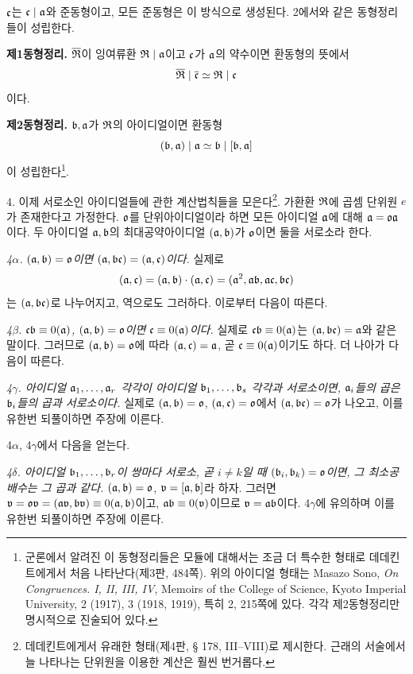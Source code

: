 \(\mc\)는 \(\mc\mid\ma\)와 준동형이고, 모든 준동형은 이 방식으로 생성된다. 2에서와 같은 동형정리들이 성립한다.

\textbf{제1동형정리.} \(\overline{\mR}\)이 잉여류환 \(\mR\mid\ma\)이고 \(\mc\)가 \(\ma\)의 약수이면 환동형의 뜻에서
\[
        \overline{\mR}\mid\overline{\mc}\simeq\mR\mid\mc
\]
이다.

\textbf{제2동형정리.} \(\mb,\ma\)가 \(\mR\)의 아이디얼이면 환동형
\[
        (\mb,\ma)\mid\ma\simeq\mb\mid[\mb,\ma]
\]
이 성립한다\footnote{군론에서 알려진 이 동형정리들은 모듈에 대해서는 조금 더 특수한 형태로 데데킨트에게서 처음 나타난다(제3판, 484쪽). 위의 아이디얼 형태는 Masazo Sono, \emph{On Congruences. I, II, III, IV}, Memoirs of the College of Science, Kyoto Imperial University, 2 (1917), 3 (1918, 1919), 특히 2, 215쪽에 있다. 각각 제2동형정리만 명시적으로 진술되어 있다.}.

4. 이제 서로소인 아이디얼들에 관한 계산법칙들을 모은다\footnote{데데킨트에게서 유래한 형태(제4판, § 178, III--VIII)로 제시한다. 근래의 서술에서 늘 나타나는 단위원을 이용한 계산은 훨씬 번거롭다.}. 가환환 \(\mR\)에 곱셈 단위원 \(e\)가 존재한다고 가정한다. \(\mo\)를 단위아이디얼이라 하면 모든 아이디얼 \(\ma\)에 대해 \(\ma=\mo\ma\)이다. 두 아이디얼 \(\ma,\mb\)의 최대공약아이디얼 \((\ma,\mb)\)가 \(\mo\)이면 둘을 서로소라 한다.

\emph{4\(\alpha\). \((\ma,\mb)=\mo\)이면 \((\ma,\mb\mc)=(\ma,\mc)\)이다.} 실제로
\[
(\ma,\mc)=(\ma,\mb)\cdot(\ma,\mc)=(\ma^2,\ma\mb,\ma\mc,\mb\mc)
\]
는 \((\ma,\mb\mc)\)로 나누어지고, 역으로도 그러하다. 이로부터 다음이 따른다.

\emph{4\(\beta\). \(\mc\mb\equiv0(\ma)\), \((\ma,\mb)=\mo\)이면 \(\mc\equiv0(\ma)\)이다.} 실제로 \(\mc\mb\equiv0(\ma)\)는 \((\ma,\mb\mc)=\ma\)와 같은 말이다. 그러므로 \((\ma,\mb)=\mo\)에 따라 \((\ma,\mc)=\ma\), 곧 \(\mc\equiv0(\ma)\)이기도 하다. 더 나아가 다음이 따른다.

\emph{4\(\gamma\). 아이디얼 \(\ma_1,\ldots,\ma_r\) 각각이 아이디얼 \(\mb_1,\ldots,\mb_s\) 각각과 서로소이면, \(\ma_i\)들의 곱은 \(\mb_i\)들의 곱과 서로소이다.} 실제로 \((\ma,\mb)=\mo\), \((\ma,\mc)=\mo\)에서 \((\ma,\mb\mc)=\mo\)가 나오고, 이를 유한번 되풀이하면 주장에 이른다.

4\(\alpha\), 4\(\gamma\)에서 다음을 얻는다.

\emph{4\(\delta\). 아이디얼 \(\mb_1,\ldots,\mb_r\)이 쌍마다 서로소, 곧 \(i\ne k\)일 때 \((\mb_i,\mb_k)=\mo\)이면, 그 최소공배수는 그 곱과 같다.} \((\ma,\mb)=\mo\), \(\mv=[\ma,\mb]\)라 하자. 그러면 \(\mv=\mo\mv=(\ma\mv,\mb\mv)\equiv0(\ma,\mb)\)이고, \(\ma\mb\equiv0(\mv)\)이므로 \(\mv=\ma\mb\)이다. 4\(\gamma\)에 유의하며 이를 유한번 되풀이하면 주장에 이른다.

